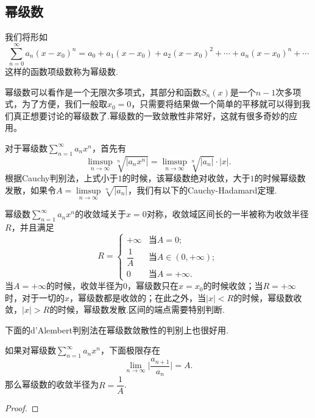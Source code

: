 \subsection{幂级数}

\begin{definition}[幂级数]
    我们将形如\[\sum_{n=0}^{\infty}a_n(x-x_0)^n=a_0+a_1(x-x_0)+a_2(x-x_0)^2+\cdots+a_n(x-x_0)^n+\cdots\]
    这样的函数项级数称为{\heiti 幂级数}.
\end{definition}

幂级数可以看作是一个无限次多项式，其部分和函数\(S_n(x)\)是一个\(n-1\)次多项式，为了方便，我们一般取\(x_0=0\)，只需要将结果做一个简单的平移就可以得到我们真正想要讨论的幂级数了.幂级数的一致敛散性非常好，这就有很多奇妙的应用。

对于幂级数\(\sum\limits_{n=1}^{\infty}a_nx^n\)，首先有\[\limsup_{n\to\infty}\sqrt[n]{\lvert a_nx^n\rvert}=\limsup_{n\to\infty}\sqrt[n]{\lvert a_n\rvert}\cdot\lvert x\rvert.\]根据Cauchy判别法，上式小于\(1\)的时候，该幂级数绝对收敛，大于\(1\)的时候幂级数发散，如果令\(A=\limsup\limits_{n\to\infty}\sqrt[n]{\lvert a_n\rvert}\)，我们有以下的Cauchy-Hadamard定理.

\begin{theorem}
    幂级数\(\sum\limits_{n=1}^{\infty}a_nx^n\)的收敛域关于\(x=0\)对称，收敛域区间长的一半被称为{\heiti 收敛半径}\(R\)，并且满足\[R=\begin{cases}
        +\infty &\text{当}A=0;\\
        \dfrac{1}{A} &\text{当}A\in (0,+\infty);\\
        0 &\text{当}A=+\infty.
    \end{cases}\]当\(A=+\infty\)的时候，收敛半径为\(0\)，幂级数只在\(x=x_0\)的时候收敛；当\(R=+\infty\)时，对于一切的\(x\)，幂级数都是收敛的；在此之外，当\(\lvert x\rvert<R\)的时候，幂级数收敛，\(\lvert x\rvert>R\)的时候，幂级数发散.区间的端点需要特别判断.
\end{theorem}

下面的d'Alembert判别法在幂级数敛散性的判别上也很好用.
\begin{theorem}[d'Alembert判别法]
    如果对幂级数\(\sum\limits_{n=1}^{\infty}a_nx^n\)，下面极限存在\[\lim_{n\to\infty}\lvert \frac{a_{n+1}}{a_n}\rvert = A.\]
    那么幂级数的收敛半径为\(R=\dfrac{1}{A}\).
\end{theorem}
\begin{proof}
    
\end{proof}



